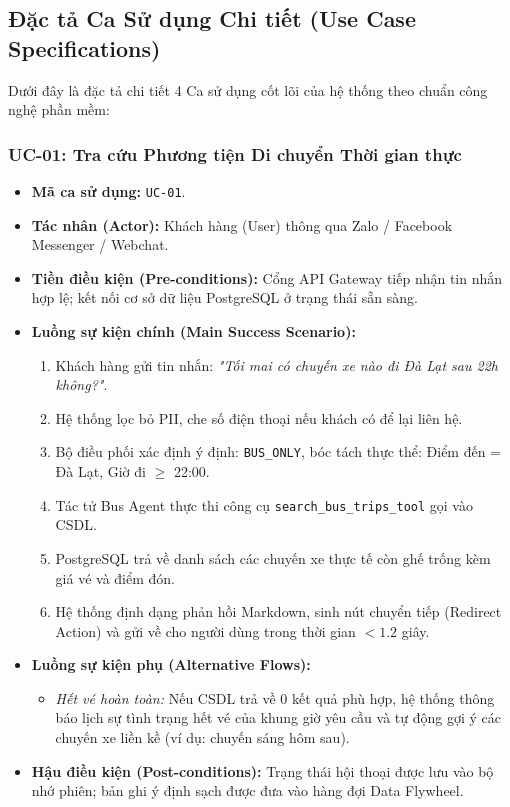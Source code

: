 \subsection{Đặc tả Ca Sử dụng Chi tiết (Use Case Specifications)}
\label{subsec:use_case_specs}

Dưới đây là đặc tả chi tiết 4 Ca sử dụng cốt lõi của hệ thống theo chuẩn công nghệ phần mềm:

\subsubsection{UC-01: Tra cứu Phương tiện Di chuyển Thời gian thực}
\begin{itemize}
    \item \textbf{Mã ca sử dụng:} \texttt{UC-01}.
    \item \textbf{Tác nhân (Actor):} Khách hàng (User) thông qua Zalo / Facebook Messenger / Webchat.
    \item \textbf{Tiền điều kiện (Pre-conditions):} Cổng API Gateway tiếp nhận tin nhắn hợp lệ; kết nối cơ sở dữ liệu PostgreSQL ở trạng thái sẵn sàng.
    \item \textbf{Luồng sự kiện chính (Main Success Scenario):}
    \begin{enumerate}
        \item Khách hàng gửi tin nhắn: \textit{"Tối mai có chuyến xe nào đi Đà Lạt sau 22h không?"}.
        \item Hệ thống lọc bỏ PII, che số điện thoại nếu khách có để lại liên hệ.
        \item Bộ điều phối xác định ý định: \texttt{BUS\_ONLY}, bóc tách thực thể: Điểm đến = Đà Lạt, Giờ đi $\ge$ 22:00.
        \item Tác tử Bus Agent thực thi công cụ \texttt{search\_bus\_trips\_tool} gọi vào CSDL.
        \item PostgreSQL trả về danh sách các chuyến xe thực tế còn ghế trống kèm giá vé và điểm đón.
        \item Hệ thống định dạng phản hồi Markdown, sinh nút chuyển tiếp (Redirect Action) và gửi về cho người dùng trong thời gian $< 1.2$ giây.
    \end{enumerate}
    \item \textbf{Luồng sự kiện phụ (Alternative Flows):}
    \begin{itemize}
        \item \textit{Hết vé hoàn toàn:} Nếu CSDL trả về 0 kết quả phù hợp, hệ thống thông báo lịch sự tình trạng hết vé của khung giờ yêu cầu và tự động gợi ý các chuyến xe liền kề (ví dụ: chuyến sáng hôm sau).
    \end{itemize}
    \item \textbf{Hậu điều kiện (Post-conditions):} Trạng thái hội thoại được lưu vào bộ nhớ phiên; bản ghi ý định sạch được đưa vào hàng đợi Data Flywheel.
\end{itemize}

